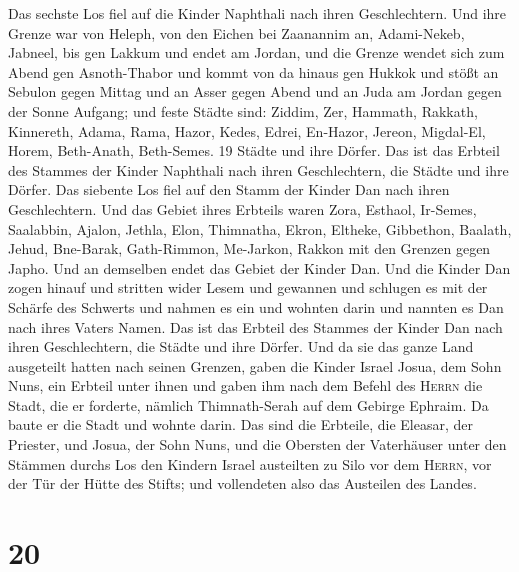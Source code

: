  Das sechste Los fiel auf die Kinder Naphthali nach ihren
Geschlechtern.  Und ihre Grenze war von Heleph, von den
Eichen bei Zaanannim an, Adami-Nekeb, Jabneel, bis gen Lakkum und endet
am Jordan,  und die Grenze wendet sich zum Abend gen
Asnoth-Thabor und kommt von da hinaus gen Hukkok und stößt an Sebulon
gegen Mittag und an Asser gegen Abend und an Juda am Jordan gegen der
Sonne Aufgang;  und feste Städte sind: Ziddim, Zer,
Hammath, Rakkath, Kinnereth,  Adama, Rama, Hazor,
 Kedes, Edrei, En-Hazor,  Jereon,
Migdal-El, Horem, Beth-Anath, Beth-Semes. 19 Städte und ihre Dörfer.
 Das ist das Erbteil des Stammes der Kinder Naphthali
nach ihren Geschlechtern, die Städte und ihre Dörfer. 
Das siebente Los fiel auf den Stamm der Kinder Dan nach ihren
Geschlechtern.  Und das Gebiet ihres Erbteils waren Zora,
Esthaol, Ir-Semes,  Saalabbin, Ajalon, Jethla,
 Elon, Thimnatha, Ekron,  Eltheke,
Gibbethon, Baalath,  Jehud, Bne-Barak, Gath-Rimmon,
 Me-Jarkon, Rakkon mit den Grenzen gegen Japho.
 Und an demselben endet das Gebiet der Kinder Dan. Und
die Kinder Dan zogen hinauf und stritten wider Lesem und gewannen und
schlugen es mit der Schärfe des Schwerts und nahmen es ein und wohnten
darin und nannten es Dan nach ihres Vaters Namen.  Das
ist das Erbteil des Stammes der Kinder Dan nach ihren Geschlechtern, die
Städte und ihre Dörfer.  Und da sie das ganze Land
ausgeteilt hatten nach seinen Grenzen, gaben die Kinder Israel Josua,
dem Sohn Nuns, ein Erbteil unter ihnen  und gaben ihm
nach dem Befehl des \textsc{Herrn} die Stadt, die er forderte, nämlich
Thimnath-Serah auf dem Gebirge Ephraim. Da baute er die Stadt und wohnte
darin.  Das sind die Erbteile, die Eleasar, der Priester,
und Josua, der Sohn Nuns, und die Obersten der Vaterhäuser unter den
Stämmen durchs Los den Kindern Israel austeilten zu Silo vor dem
\textsc{Herrn}, vor der Tür der Hütte des Stifts; und vollendeten also
das Austeilen des Landes.

\hypertarget{section-19}{%
\section{20}\label{section-19}}

